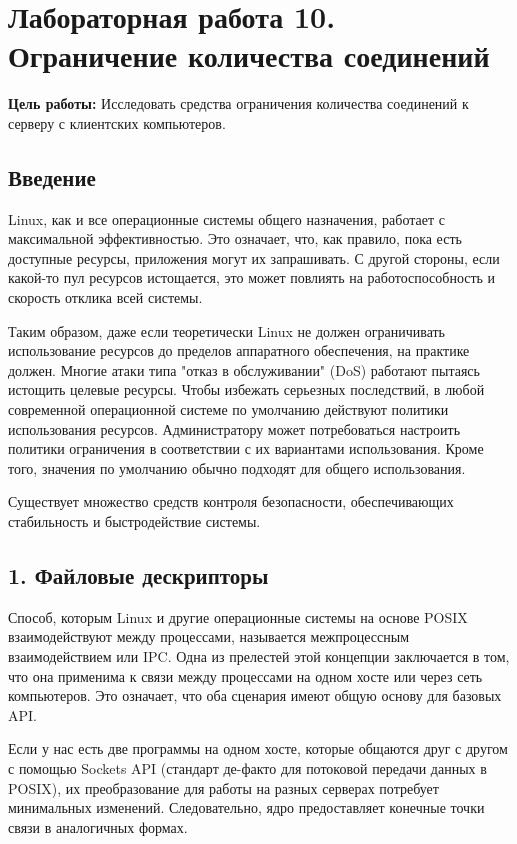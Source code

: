 \chapter*{Лабораторная работа 10. Ограничение количества соединений}

\textbf{Цель работы:} Исследовать средства ограничения количества соединений к серверу с клиентских компьютеров.

\section*{Введение}

Linux, как и все операционные системы общего назначения, работает с максимальной эффективностью. Это означает, что, как правило, пока есть доступные ресурсы, приложения могут их запрашивать. С другой стороны, если какой-то пул ресурсов истощается, это может повлиять на работоспособность и скорость отклика всей системы.

Таким образом, даже если теоретически Linux не должен ограничивать использование ресурсов до пределов аппаратного обеспечения, на практике должен. Многие атаки типа "отказ в обслуживании" (DoS) работают пытаясь истощить целевые ресурсы. Чтобы избежать серьезных последствий, в любой современной операционной системе по умолчанию действуют политики использования ресурсов. Администратору может потребоваться настроить политики ограничения в соответствии с их вариантами использования. Кроме того, значения по умолчанию обычно подходят для общего использования.

Существует множество средств контроля безопасности, обеспечивающих стабильность и быстродействие системы.

\section*{1. Файловые дескрипторы}

Способ, которым Linux и другие операционные системы на основе POSIX взаимодействуют между процессами, называется межпроцессным взаимодействием или IPC. Одна из прелестей этой концепции заключается в том, что она применима к связи между процессами на одном хосте или через сеть компьютеров. Это означает, что оба сценария имеют общую основу для базовых API.

Если у нас есть две программы на одном хосте, которые общаются друг с другом с помощью Sockets API (стандарт де-факто для потоковой передачи данных в POSIX), их преобразование для работы на разных серверах потребует минимальных изменений. Следовательно, ядро предоставляет конечные точки связи в аналогичных формах.

